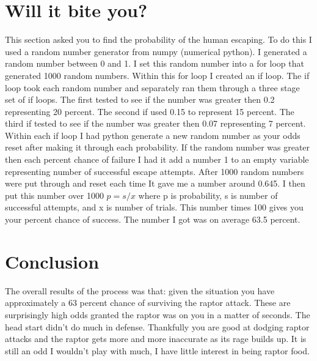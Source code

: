 \documentclass[twocolumn]{revtex4}
\begin{document}
\section{Will it bite you?}
	This section asked you to find the probability of the human escaping. To do this I used a random number generator from numpy (numerical python). I generated a random number between 0 and 1. I set this random number into a for loop that generated 1000 random numbers. Within this for loop I created an if loop. The if loop took each random number and separately ran them through a three stage set of if loops. The first tested to see if the number was greater then 0.2 representing 20 percent. The second if used 0.15 to represent 15 percent. The third if tested to see if the number was greater then 0.07 representing 7 percent. Within each if loop I had python generate a new random number as your odds reset after making it through each probability. If the random number was greater then each percent chance of failure I had it add a number 1 to an empty variable representing number of successful escape attempts. After 1000 random numbers were put through and reset each time It gave me a number around 0.645. I then put this number over 1000 $ p = s/x $ where p is probability, s is number of successful attempts, and x is number of trials. This number times 100 gives you your percent chance of success. The number I got was on average 63.5 percent. 
	
\section{Conclusion}
	The overall results of the process was that: given the situation you have approximately a 63 percent chance of surviving the raptor attack. These are surprisingly high odds granted the raptor was on you in a matter of seconds. The head start didn't do much in defense. Thankfully you are good at dodging raptor attacks and the raptor gets more and more inaccurate as its rage builds up. It is still an odd I wouldn't play with much, I have little interest in being raptor food. 


\end{document}
